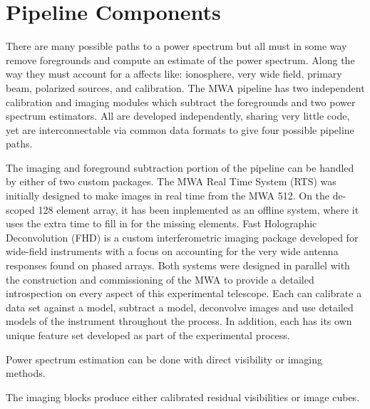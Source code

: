 \section{Pipeline Components}
  There are many possible paths to a power spectrum but all must in some way remove foregrounds and compute an estimate of the power spectrum. Along the way they must account for a affects like: ionosphere, very wide field, primary beam, polarized sources, and calibration. The MWA pipeline has two independent calibration and imaging modules which subtract the foregrounds and two power spectrum estimators. All are developed independently, sharing very little code, yet are interconnectable via common data formats to give four possible pipeline paths.

The imaging and foreground subtraction portion of the pipeline can be handled by either of two custom packages.  The MWA Real Time System (RTS) was initially designed to make images in real time from the MWA 512.  On the de-scoped 128 element array, it has been implemented as an offline system, where it uses the extra time to fill in for the missing elements.  Fast Holographic Deconvolution (FHD) is a custom interferometric imaging package developed for wide-field instruments with a focus on accounting for the very wide antenna responses found on phased arrays.  Both systems were designed in parallel with the construction and commissioning of the MWA to provide a detailed introspection on every aspect of this experimental telescope. Each can calibrate a data set against a model, subtract a model, deconvolve images and use detailed models of the instrument throughout the process.  In addition, each has its own unique feature set developed as part of the experimental process.

Power spectrum estimation can be done with direct visibility or imaging methods.

The imaging blocks produce either calibrated residual visibilities or image cubes.